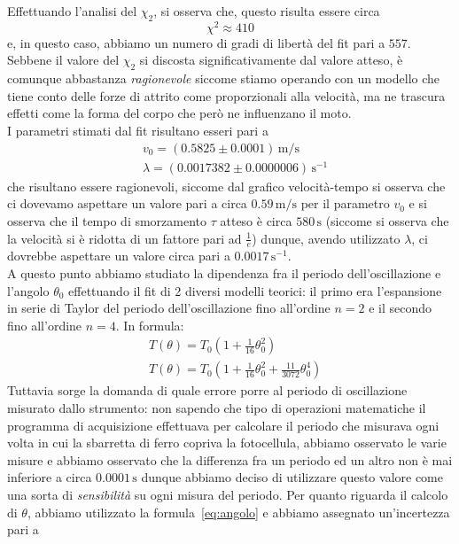 \documentclass{article}
\begin{document}
\noindent Effettuando l'analisi del $\chi_2$, si osserva che, questo risulta essere circa
$$
	\chi^2 \approx 410
$$
e, in questo caso, abbiamo un numero di gradi di libertà del fit pari a $557$. Sebbene il valore del $\chi_2$ si discosta significativamente dal valore atteso, è comunque abbastanza \emph{ragionevole} siccome stiamo operando con un modello che tiene conto delle forze di attrito come proporzionali alla velocità, ma ne trascura effetti come la forma del corpo che però ne influenzano il moto. \\
I parametri stimati dal fit risultano esseri pari a
\begin{align}
	&v_0 = (0.5825 \pm 0.0001) \, \si{\meter\per\second} \\
	&\lambda = (0.0017382 \pm 0.0000006)\, \si{\second^{-1}}
\end{align}
che risultano essere ragionevoli, siccome dal grafico velocità-tempo si osserva che ci dovevamo aspettare un valore pari a circa $0.59 \, \si{\meter\per\second}$ per il parametro $v_0$ e si osserva che il tempo di smorzamento $\tau$ atteso è circa $580 \, \si{\second}$ (siccome si osserva che la velocità si è ridotta di un fattore pari ad $\frac{1}{e}$) dunque, avendo utilizzato $\lambda$, ci dovrebbe aspettare un valore circa pari a $0.0017 \, \si{\second^{-1}}$. \\
A questo punto abbiamo studiato la dipendenza fra il periodo dell'oscillazione e l'angolo $\theta_0$ effettuando il fit di 2 diversi modelli teorici: il primo era l'espansione in serie di Taylor del periodo dell'oscillazione fino all'ordine $n=2$ e il secondo fino all'ordine $n=4$. In formula:
\begin{align}
	&T(\theta) = T_0 \left(1 + \frac{1}{16}\theta_0^2 \right) \\
	&T(\theta) = T_0 \left(1 + \frac{1}{16}\theta_0^2 + \frac{11}{3072}\theta_0^4 \right)
\end{align}
Tuttavia sorge la domanda di quale errore porre al periodo di oscillazione misurato dallo strumento: non sapendo che tipo di operazioni matematiche il programma di acquisizione effettuava per calcolare il periodo che misurava ogni volta in cui la sbarretta di ferro copriva la fotocellula, abbiamo osservato le varie misure e abbiamo osservato che la differenza fra un periodo ed un altro non è mai inferiore a circa $0.0001 \, \si{\second}$ dunque abbiamo deciso di utilizzare questo valore come una sorta di \emph{sensibilità} su ogni misura del periodo. Per quanto riguarda il calcolo di $\theta$, abbiamo utilizzato la formula~\ref{eq:angolo} e abbiamo assegnato un'incertezza pari a
\end{document}
